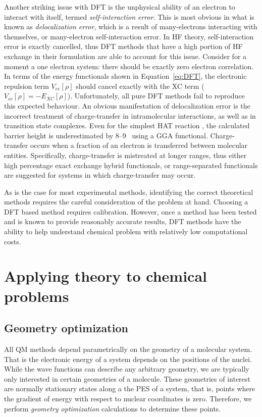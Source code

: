 Another striking issue with DFT is the unphysical ability of an electron to
interact with itself, termed \emph{self-interaction error}. This is most
obvious in what is known as \emph{delocalization error}, which is a result of
many-electrons interacting with themselves, or many-electron self-interaction
error. In HF theory, self-interaction error is exactly cancelled, thus DFT
methods that have a high portion of HF exchange in their formulation are able
to account for this issue. Consider for a moment a one electron system: there
should be exactly zero electron correlation. In terms of the energy functionals
shown in Equation~\ref{eq:DFT}, the electronic repulsion term $V_{ee}[\rho]$
should cancel exactly with the XC term ($V_{ee}[\rho] =
-E_{XC}[\rho]$).\cite{Cramer2004} Unfortunately, all pure DFT methods fail to
reproduce this expected behaviour. An obvious manifestation of delocalization
error is the incorrect treatment of charge-transfer in intramolecular
interactions,\cite{MoriSanchez2008,OterodelaRoza2014} as well as in transition
state complexes. Even for the simplest HAT reaction ,
the calculated barrier height is underestimated by 8--9 \kcalmol\ using a GGA
functional.\cite{Csonka1998} Charge-transfer occurs when a fraction of an
electron is transferred between molecular entities. Specifically,
charge-transfer is mistreated at longer ranges, thus either high percentage
exact exchange hybrid functionals, or range-separated functionals are suggested
for systems in which charge-transfer may occur.

As is the case for most experimental methods, identifying the correct
theoretical methods requires the careful consideration of the problem at hand.
Choosing a DFT based method requires calibration. However, once a method has
been tested and is known to provide reasonably accurate results, DFT methods
have the ability to help understand chemical problem with relatively low
computational costs.

\section{Applying theory to chemical problems}

\subsection{Geometry optimization}

All QM methods depend parametrically on the geometry of a molecular system. That
is the electronic energy of a system depends on the positions of the nuclei.
While the wave functions can describe any arbitrary geometry, we are typically
only interested in certain geometries of a molecule. These geometries of
interest are normally stationary states along a the PES of a system, that is,
points where the gradient of energy with respect to nuclear coordinates is zero.
Therefore, we perform \emph{geometry optimization} calculations to determine
these points.

